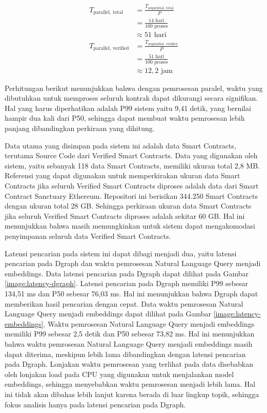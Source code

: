 \begin{align*}
    T_{\text{parallel, total}} &= \frac{T_{\text{sequential, total}}}{P} \\
    &= \frac{14 \text{ hari}}{100 \text{ proses}} \\
	&\approx 51 \text{ hari} \\
    T_{\text{parallel, verified}} &= \frac{T_{\text{sequential, verified}}}{P} \\
    &= \frac{51 \text{ hari}}{100 \text{ proses}} \\
	&\approx 12,2 \text{ jam}
\end{align*}

Perhitungan berikut menunjukkan bahwa dengan pemrosesan paralel, waktu yang dibutuhkan untuk memproses seluruh kontrak dapat dikurangi secara signifikan. Hal yang harus diperhatikan adalah P99 sistem yaitu 9,41 detik, yang bernilai hampir dua kali dari P50, sehingga dapat membuat waktu pemrosesan lebih panjang dibandingkan perkiraan yang dihitung.


Data utama yang disimpan pada sistem ini adalah data Smart Contracts, terutama Source Code dari Verified Smart Contracts. Data yang digunakan oleh sistem, yaitu sebanyak 118 data Smart Contracts, memiliki ukuran total 2,8 MB. Referensi yang dapat digunakan untuk memperkirakan ukuran data Smart Contracts jika seluruh Verified Smart Contracts diproses adalah data dari Smart Contract Sanctuary Ethereum. Repositori ini berisikan 344.250 Smart Contracts dengan ukuran total 28 GB. Sehingga perkiraan ukuran data Smart Contracts jika seluruh Verified Smart Contracts diproses adalah sekitar 60 GB. Hal ini menunjukkan bahwa masih memungkinkan untuk sistem dapat mengakomodasi penyimpanan seluruh data Verified Smart Contracts.


Latensi pencarian pada sistem ini dapat dibagi menjadi dua, yaitu latensi pencarian pada Dgraph dan waktu pemrosesan Natural Language Query menjadi embeddings. Data latensi pencarian pada Dgraph dapat dilihat pada Gambar \ref{image:latency-dgraph}. Latensi pencarian pada Dgraph memiliki P99 sebesar 134,51 ms dan P50 sebesar 76,03 ms. Hal ini menunjukkan bahwa Dgraph dapat memberikan hasil pencarian dengan cepat. Data waktu pemrosesan Natural Language Query menjadi embeddings dapat dilihat pada Gambar \ref{image:latency-embeddings}. Waktu pemrosesan Natural Language Query menjadi embeddings memiliki P99 sebesar 2,5 detik dan P50 sebesar 73,82 ms. Hal ini menunjukkan bahwa waktu pemrosesan Natural Language Query menjadi embeddings masih dapat diterima, meskipun lebih lama dibandingkan dengan latensi pencarian pada Dgraph. Lonjakan waktu pemrosesan yang terlihat pada data disebabkan oleh lonjakan load pada CPU yang digunakan untuk menjalankan model embeddings, sehingga menyebabkan waktu pemrosesan menjadi lebih lama. Hal ini tidak akan dibahas lebih lanjut karena berada di luar lingkup topik, sehingga fokus analisis hanya pada latensi pencarian pada Dgraph.

